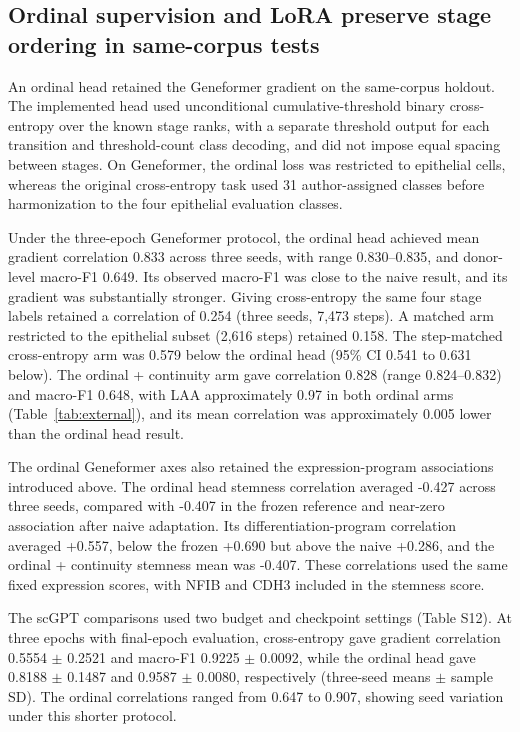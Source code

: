 \documentclass[12pt,letterpaper]{article}
\begin{document}
\subsection*{Ordinal supervision and LoRA preserve stage ordering in same-corpus tests}

An ordinal head retained the Geneformer gradient on the same-corpus holdout. The implemented head used unconditional cumulative-threshold binary cross-entropy over the known stage ranks, with a separate threshold output for each transition and threshold-count class decoding, and did not impose equal spacing between stages. On Geneformer, the ordinal loss was restricted to epithelial cells, whereas the original cross-entropy task used 31 author-assigned classes before harmonization to the four epithelial evaluation classes.

Under the three-epoch Geneformer protocol, the ordinal head achieved mean gradient correlation 0.833 across three seeds, with range 0.830--0.835, and donor-level macro-F1 0.649. Its observed macro-F1 was close to the naive result, and its gradient was substantially stronger. Giving cross-entropy the same four stage labels retained a correlation of 0.254 (three seeds, 7,473 steps). A matched arm restricted to the epithelial subset (2,616 steps) retained 0.158. The step-matched cross-entropy arm was 0.579 below the ordinal head (95\% CI 0.541 to 0.631 below). The ordinal + continuity arm gave correlation 0.828 (range 0.824--0.832) and macro-F1 0.648, with LAA approximately 0.97 in both ordinal arms (Table~\ref{tab:external}), and its mean correlation was approximately 0.005 lower than the ordinal head result.

The ordinal Geneformer axes also retained the expression-program associations introduced above. The ordinal head stemness correlation averaged -0.427 across three seeds, compared with -0.407 in the frozen reference and near-zero association after naive adaptation. Its differentiation-program correlation averaged +0.557, below the frozen +0.690 but above the naive +0.286, and the ordinal + continuity stemness mean was -0.407. These correlations used the same fixed expression scores, with NFIB and CDH3 included in the stemness score.

The scGPT comparisons used two budget and checkpoint settings (Table S12). At three epochs with final-epoch evaluation, cross-entropy gave gradient correlation 0.5554 $\pm$ 0.2521 and macro-F1 0.9225 $\pm$ 0.0092, while the ordinal head gave 0.8188 $\pm$ 0.1487 and 0.9587 $\pm$ 0.0080, respectively (three-seed means $\pm$ sample SD). The ordinal correlations ranged from 0.647 to 0.907, showing seed variation under this shorter protocol.
\end{document}
